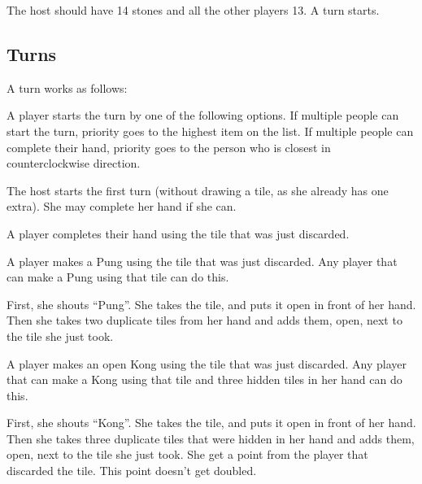 \documentclass{article}
\begin{document}
The host should have 14 stones and all the other players 13. A turn starts.

\subsection{Turns}
A turn works as follows:
\begin{enumerate*}
    \item A player starts the turn by one of the following options. If multiple people can start the turn, priority goes to the highest item on the list. If multiple people can complete their hand, priority goes to the person who is closest in counterclockwise direction.
    \begin{enumerate*}
        \item The host starts the first turn (without drawing a tile, as she already has one extra). She may complete her hand if she can.
        \item A player completes their hand using the tile that was just discarded.
        \item A player makes a Pung using the tile that was just discarded. Any player that can make a Pung using that tile can do this.

        First, she shouts ``Pung''. She takes the tile, and puts it open in front of her hand. Then she takes two duplicate tiles from her hand and adds them, open, next to the tile she just took.
        \item A player makes an open Kong using the tile that was just discarded. Any player that can make a Kong using that tile and three hidden tiles in her hand can do this.

        First, she shouts ``Kong''. She takes the tile, and puts it open in front of her hand. Then she takes three duplicate tiles that were hidden in her hand and adds them, open, next to the tile she just took.
        She get a point from the player that discarded the tile. This point doesn't get doubled.


\end{enumerate*}
\end{enumerate*}
\end{document}
